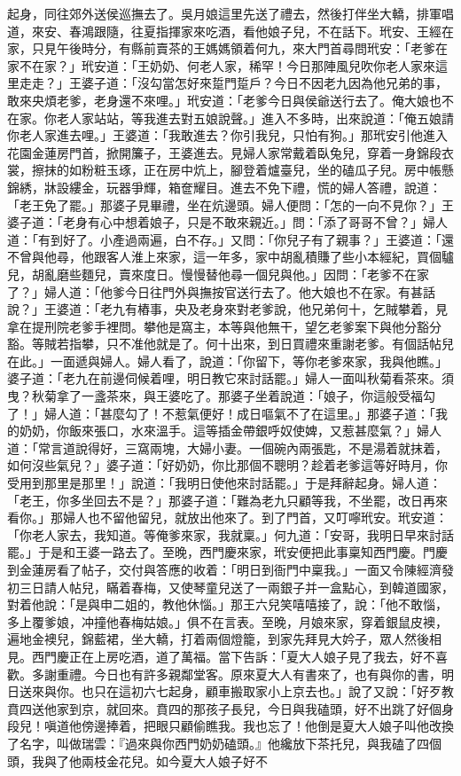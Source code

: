 起身，同往郊外送侯巡撫去了。吳月娘這里先送了禮去，然後打伴坐大轎，排軍唱道，來安、春鴻跟隨，往夏指揮家來吃酒，看他娘子兒，不在話下。玳安、王經在家，只見午後時分，有縣前賣茶的王媽媽領着何九，來大門首尋問玳安：「老爹在家不在家？」玳安道：「王奶奶、何老人家，稀罕！今日那陣風兒吹你老人家來這里走走？」王婆子道：「沒勾當怎好來踅門踅戶？今日不因老九因為他兄弟的事，敢來央煩老爹，老身還不來哩。」玳安道：「老爹今日與侯爺送行去了。俺大娘也不在家。你老人家站站，等我進去對五娘說聲。」進入不多時，出來說道：「俺五娘請你老人家進去哩。」王婆道：「我敢進去？你引我兒，只怕有狗。」那玳安引他進入花園金蓮房門首，掀開簾子，王婆進去。見婦人家常戴着臥兔兒，穿着一身錦段衣裳，擦抹的如粉粧玉琢，正在房中炕上，腳登着爐臺兒，坐的磕瓜子兒。房中帳懸錦綉，牀設縷金，玩器爭輝，箱奩耀目。進去不免下禮，慌的婦人答禮，說道：「老王免了罷。」那婆子見畢禮，坐在炕邊頭。婦人便問：「怎的一向不見你？」王婆子道：「老身有心中想着娘子，只是不敢來親近。」問：「添了哥哥不曾？」婦人道：「有到好了。小產過兩遍，白不存。」又問：「你兒子有了親事？」王婆道：「還不曾與他尋，他跟客人淮上來家，這一年多，家中胡亂積賺了些小本經紀，買個驢兒，胡亂磨些麵兒，賣來度日。慢慢替他尋一個兒與他。」因問：「老爹不在家了？」婦人道：「他爹今日往門外與撫按官送行去了。他大娘也不在家。有甚話說？」王婆道：「老九有樁事，央及老身來對老爹說，他兄弟何十，乞賊攀着，見拿在提刑院老爹手裡問。攀他是窩主，本等與他無干，望乞老爹案下與他分豁分豁。等賊若指攀，只不准他就是了。何十出來，到日買禮來重謝老爹。有個話帖兒在此。」一面遞與婦人。婦人看了，說道：「你留下，等你老爹來家，我與他瞧。」婆子道：「老九在前邊伺候着哩，明日教它來討話罷。」婦人一面叫秋菊看茶來。須曳？秋菊拿了一盞茶來，與王婆吃了。那婆子坐着說道：「娘子，你這般受福勾了！」婦人道：「甚麼勾了！不惹氣便好！成日嘔氣不了在這里。」那婆子道：「我的奶奶，你飯來張口，水來溫手。這等插金帶銀呼奴使婢，又惹甚麼氣？」婦人道：「常言道說得好，三窩兩塊，大婦小妻。一個碗內兩張匙，不是湯着就抹着，如何沒些氣兒？」婆子道：「好奶奶，你比那個不聰明？趁着老爹這等好時月，你受用到那里是那里！」說道：「我明日使他來討話罷。」于是拜辭起身。婦人道：「老王，你多坐回去不是？」那婆子道：「難為老九只顧等我，不坐罷，改日再來看你。」那婦人也不留他留兒，就放出他來了。到了門首，又叮嚀玳安。玳安道：「你老人家去，我知道。等俺爹來家，我就稟。」何九道：「安哥，我明日早來討話罷。」于是和王婆一路去了。至晚，西門慶來家，玳安便把此事稟知西門慶。門慶到金蓮房看了帖子，交付與答應的收着：「明日到衙門中稟我。」一面又令陳經濟發初三日請人帖兒，瞞着春梅，又使琴童兒送了一兩銀子并一盒點心，到韓道國家，對着他說：「是與申二姐的，教他休惱。」那王六兒笑嘻嘻接了，說：「他不敢惱，多上覆爹娘，冲撞他春梅姑娘。」俱不在言表。至晚，月娘來家，穿着銀鼠皮襖，遍地金襖兒，錦藍裙，坐大轎，打着兩個燈籠，到家先拜見大妗子，眾人然後相見。西門慶正在上房吃酒，道了萬福。當下告訴：「夏大人娘子見了我去，好不喜歡。多謝重禮。今日也有許多親鄰堂客。原來夏大人有書來了，也有與你的書，明日送來與你。也只在這初六七起身，顧車搬取家小上京去也。」說了又說：「好歹教賁四送他家到京，就回來。賁四的那孩子長兒，今日與我磕頭，好不出跳了好個身段兒！嗔道他傍邊捧着，把眼只顧偷瞧我。我也忘了！他倒是夏大人娘子叫他改換了名字，叫做瑞雲：『過來與你西門奶奶磕頭。』他纔放下茶托兒，與我磕了四個頭，我與了他兩枝金花兒。如今夏大人娘子好不